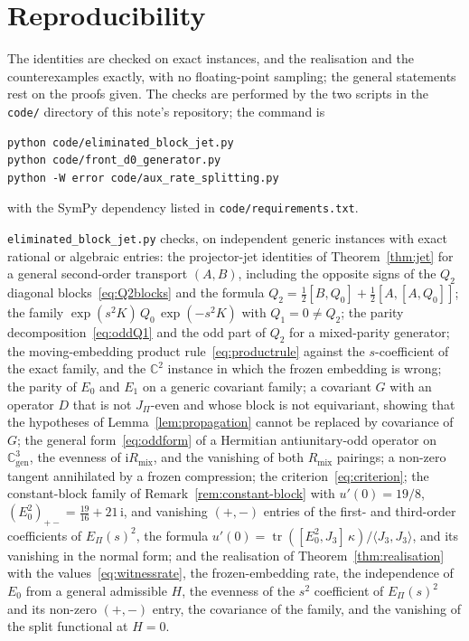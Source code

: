 \documentclass[11pt]{article}
\theoremstyle{definition}
\theoremstyle{remark}
\newcommand{\JPi}{J_{\Pi}}
\newcommand{\Jthree}{J_{3}}
\newcommand{\Rmix}{R_{\mathrm{mix}}}
\newcommand{\Cgen}{\mathbb{C}^{3}_{\mathrm{gen}}}
\newcommand{\Epi}{E_{\Pi}}
\newcommand{\tr}{\operatorname{tr}}
\begin{document}
  \appendix

  \section{Reproducibility}
    \label{sec:repro}

    The identities are checked on exact instances, and the realisation and the counterexamples exactly, with no
    floating-point sampling; the general statements rest on the proofs given.
    The checks are performed by the two scripts in the \texttt{code/} directory of this note's repository; the command
    is
    \begin{verbatim}
python code/eliminated_block_jet.py
python code/front_d0_generator.py
python -W error code/aux_rate_splitting.py
    \end{verbatim}
    with the SymPy dependency listed in \texttt{code/requirements.txt}.

    \texttt{eliminated\_block\_jet.py} checks, on independent generic instances with exact rational or algebraic
    entries:
    the projector-jet identities of Theorem~\ref{thm:jet} for a general second-order transport $(A, B)$, including the
    opposite signs of the $Q_2$ diagonal blocks~\eqref{eq:Q2blocks} and the formula $Q_2 = \tfrac12[B,Q_0] +
    \tfrac12[A,[A,Q_0]]$; the family $\exp(s^2 K)\,Q_0\,\exp(-s^2 K)$ with $Q_1 = 0 \neq Q_2$; the parity
    decomposition~\eqref{eq:oddQ1} and the odd part of $Q_2$ for a mixed-parity generator; the moving-embedding product
    rule~\eqref{eq:productrule} against the $s$-coefficient of the exact family, and the $\mathbb{C}^2$ instance in
    which
    the frozen embedding is wrong; the parity of $E_0$ and $E_1$ on a generic covariant family; a covariant $G$ with an
    operator $D$ that is not $\JPi$-even and
    whose block is not equivariant, showing that the hypotheses of Lemma~\ref{lem:propagation} cannot be
    replaced by covariance of $G$; the general form~\eqref{eq:oddform} of a Hermitian antiunitary-odd operator on
    $\Cgen$, the evenness of $\mathrm{i}\Rmix$, and the vanishing of both $\Rmix$ pairings; a non-zero tangent
    annihilated by a frozen compression; the criterion~\eqref{eq:criterion}; the constant-block family of
    Remark~\ref{rem:constant-block} with $u'(0) = 19/8$, $(E_0^2)_{+-} = \tfrac{19}{16} + 21\,\mathrm{i}$, and vanishing
    $(+,-)$ entries of the first- and third-order coefficients of $\Epi(s)^2$, the formula $u'(0) = \tr([E_0^2,
    \Jthree]\,\kappa)/\langle
    \Jthree,
    \Jthree\rangle$, and its vanishing in the normal form; and the realisation of Theorem~\ref{thm:realisation} with the
    values~\eqref{eq:witnessrate}, the frozen-embedding rate, the independence of $E_0$ from a general admissible $H$,
    the evenness of the $s^2$ coefficient of $\Epi(s)^2$ and its non-zero $(+,-)$ entry, the covariance of the family,
    and the vanishing of the split functional at $H = 0$.
\end{document}
